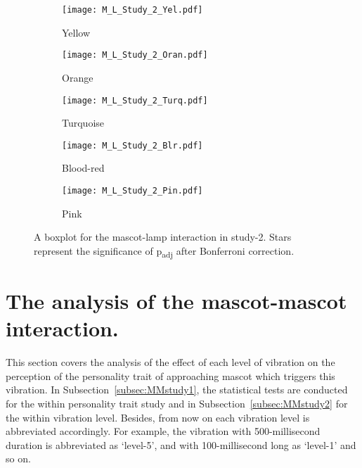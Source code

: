 \begin{figure}[hbt!]
    \centering
    \begin{subfigure}{.45\textwidth}
        \centering
        \texttt{[image: M\_L\_Study\_2\_Yel.pdf]}
        \caption{Yellow}
        \label{fig:sub1}
    \end{subfigure}\hfill%
    \begin{subfigure}{.45\textwidth}
        \centering
        \texttt{[image: M\_L\_Study\_2\_Oran.pdf]}
        \caption{Orange}
        \label{fig:sub2}
    \end{subfigure}\hfill
    \begin{subfigure}{.45\textwidth}
        \centering
        \texttt{[image: M\_L\_Study\_2\_Turq.pdf]}
        \caption{Turquoise}
        \label{fig:sub1}
    \end{subfigure}\hfill%
    \begin{subfigure}{.45\textwidth}
        \centering
        \texttt{[image: M\_L\_Study\_2\_Blr.pdf]}
        \caption{Blood-red}
        \label{fig:sub1}
    \end{subfigure}\hfill%
    \begin{subfigure}{.45\textwidth}
        \centering
        \texttt{[image: M\_L\_Study\_2\_Pin.pdf]}
        \caption{Pink}
        \label{fig:sub1}
    \end{subfigure}\hfill%
    \caption{A boxplot for the mascot-lamp interaction in study-2.
    Stars represent the significance of p\textsubscript{adj} after Bonferroni correction.}
    \label{fig:ML2}
\end{figure}
\section{The analysis of the mascot-mascot interaction.}
\label{sec:m-m}
This section covers the analysis of the effect of each level of vibration on the perception
of the personality trait of approaching mascot which triggers this vibration.
In Subsection~\ref{subsec:MMstudy1}, the statistical tests are conducted for the within
personality trait study and in Subsection~\ref{subsec:MMstudy2} for the within vibration level.
Besides, from now on each vibration level is abbreviated accordingly.
For example, the vibration with 500-millisecond duration is abbreviated
as ‘level-5’, and with 100-millisecond long as ‘level-1’ and so on.

